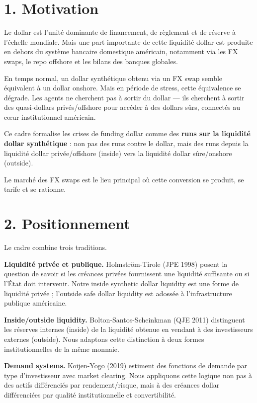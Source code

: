 
\section*{1. Motivation}

Le dollar est l'unité dominante de financement, de règlement et de
réserve à l'échelle mondiale. Mais une part importante de cette
liquidité dollar est produite en dehors du système bancaire domestique
américain, notamment via les FX swaps, le repo offshore et les bilans
des banques globales.

En temps normal, un dollar synthétique obtenu via un FX swap semble
équivalent à un dollar onshore. Mais en période de stress, cette
équivalence se dégrade. Les agents ne cherchent pas à sortir du
dollar — ils cherchent à sortir des quasi-dollars privés/offshore
pour accéder à des dollars sûrs, connectés au cœur institutionnel
américain.

Ce cadre formalise les crises de funding dollar comme des \textbf{runs sur
la liquidité dollar synthétique} : non pas des runs contre le dollar,
mais des runs depuis la liquidité dollar privée/offshore (inside)
vers la liquidité dollar sûre/onshore (outside).

Le marché des FX swaps est le lieu principal où cette conversion
se produit, se tarife et se rationne.

\section*{2. Positionnement}

Le cadre combine trois traditions.

\textbf{Liquidité privée et publique.} Holmström-Tirole (JPE 1998) posent
la question de savoir si les créances privées fournissent une liquidité
suffisante ou si l'État doit intervenir. Notre inside synthetic dollar
liquidity est une forme de liquidité privée ; l'outside safe dollar
liquidity est adossée à l'infrastructure publique américaine.

\textbf{Inside/outside liquidity.} Bolton-Santos-Scheinkman (QJE 2011)
distinguent les réserves internes (inside) de la liquidité obtenue
en vendant à des investisseurs externes (outside). Nous adaptons
cette distinction à deux formes institutionnelles de la même monnaie.

\textbf{Demand systems.} Koijen-Yogo (2019) estiment des fonctions de
demande par type d'investisseur avec market clearing. Nous appliquons
cette logique non pas à des actifs différenciés par rendement/risque,
mais à des créances dollar différenciées par qualité institutionnelle
et convertibilité.

